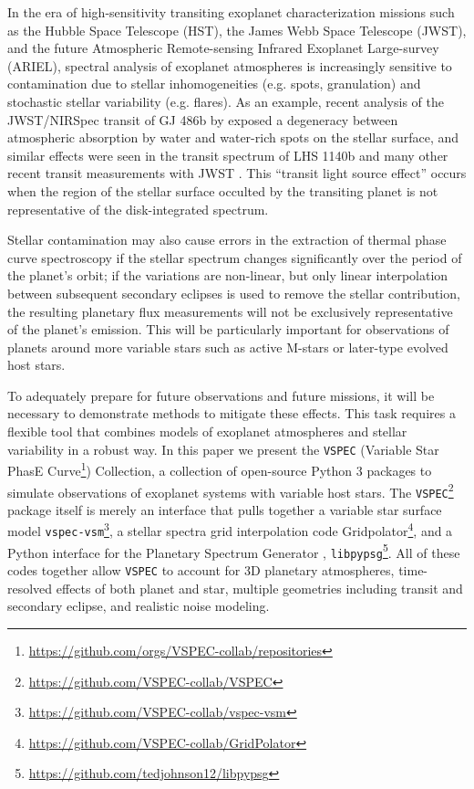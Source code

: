 \documentclass[linenumbers,5p,twocolumn,authoryear]{elsarticle}
\newcommand{\vspec}[1]{\texttt{VSPEC}#1}
\begin{document}
In the era of high-sensitivity transiting exoplanet characterization missions such as the Hubble Space Telescope (HST), the James Webb Space Telescope (JWST), and the future Atmospheric Remote-sensing Infrared Exoplanet Large-survey (ARIEL), spectral analysis of exoplanet atmospheres is increasingly sensitive to contamination due to stellar inhomogeneities (e.g. spots, granulation) and stochastic stellar variability (e.g. flares).  As an example, recent analysis of the JWST/NIRSpec transit of GJ 486b by \citet{moran2023} exposed a degeneracy between atmospheric absorption by water and water-rich spots on the stellar surface, and similar effects were seen in the transit spectrum of LHS 1140b \citep{cadieux2024} and many other recent transit measurements with JWST \citep[e.g.,][]{lim2023,may2023,fournier-tondreau2024}. This ``transit light source effect'' \citep[TLS,][see also \citet{apai2018,barclay2021,garcia2022,barclay2023}]{rackham2018} occurs when the region of the stellar surface occulted by the transiting planet is not representative of the disk-integrated spectrum.

Stellar contamination may also cause errors in the extraction of thermal phase curve spectroscopy if the stellar spectrum changes significantly over the period of the planet's orbit; if the variations are non-linear, but only linear interpolation between subsequent secondary eclipses is used to remove the stellar contribution, the resulting planetary flux measurements will not be exclusively representative of the planet's emission. This will be particularly important for observations of planets around more variable stars such as active M-stars or later-type evolved host stars. %

To adequately prepare for future observations and future missions, it will be necessary to demonstrate methods to mitigate these effects. This task requires a flexible tool that combines models of exoplanet atmospheres and stellar variability in a robust way. In this paper we present the \vspec{} (Variable Star PhasE Curve\footnote{\url{https://github.com/orgs/VSPEC-collab/repositories}}) Collection, a collection of open-source Python 3 packages to simulate observations of exoplanet systems with variable host stars. The \vspec{}\footnote{\url{https://github.com/VSPEC-collab/VSPEC}} package itself is merely an interface that pulls together a variable star surface model \texttt{vspec-vsm}\footnote{\url{https://github.com/VSPEC-collab/vspec-vsm}}, a stellar spectra grid interpolation code Gridpolator\footnote{\url{https://github.com/VSPEC-collab/GridPolator}}, and a Python interface for the Planetary Spectrum Generator \citep[PSG,][]{villanueva2018}, \texttt{libpypsg}\footnote{\url{https://github.com/tedjohnson12/libpypsg}}. All of these codes together allow \vspec{} to account for 3D planetary atmospheres, time-resolved effects of both planet and star, multiple geometries including transit and secondary eclipse, and realistic noise modeling.
\end{document}
